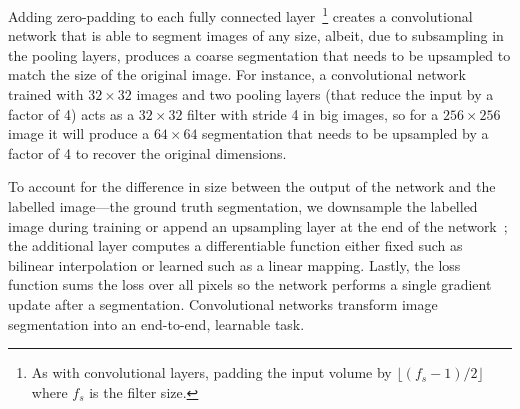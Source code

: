 Adding zero-padding to each fully connected layer~\footnote{As with convolutional layers, padding the input volume by $\lfloor (f_s-1)/2\rfloor$ where $f_s$ is the filter size.} creates a convolutional network that is able to segment images of any size, albeit, due to subsampling in the pooling layers, produces a coarse segmentation that needs to be upsampled to match the size of the original image.
For instance, a convolutional network trained with $32\times 32$ images and two pooling layers (that reduce the input by a factor of 4) acts as a $32 \times 32$ filter with stride 4 in big images, so for a $256 \times 256$ image it will produce a $64 \times 64$ segmentation that needs to be upsampled by a factor of 4 to recover the original dimensions.

To account for the difference in size between the output of the network and the labelled image---the ground truth segmentation\textemdash, we downsample the labelled image during training or append an upsampling layer at the end of the network~\cite{Long2015}; the additional layer computes a differentiable function either fixed such as bilinear interpolation or learned such as a linear mapping.
Lastly, the loss function sums the loss over all pixels so the network performs a single gradient update after a segmentation. 
Convolutional networks transform image segmentation into an end-to-end, learnable task.

